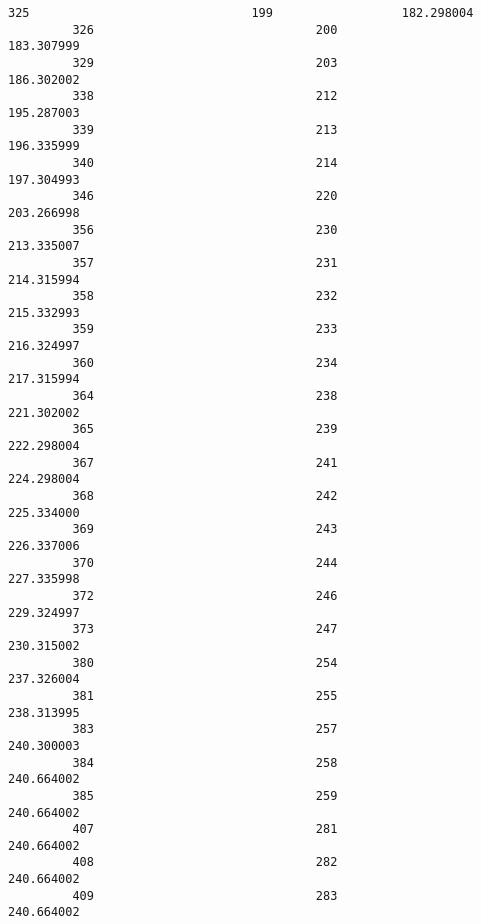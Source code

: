 \documentclass[11pt]{article}
\begin{document}
\begin{Verbatim}[commandchars=\\\{\}]
         325                               199                  182.298004   
         326                               200                  183.307999   
         329                               203                  186.302002   
         338                               212                  195.287003   
         339                               213                  196.335999   
         340                               214                  197.304993   
         346                               220                  203.266998   
         356                               230                  213.335007   
         357                               231                  214.315994   
         358                               232                  215.332993   
         359                               233                  216.324997   
         360                               234                  217.315994   
         364                               238                  221.302002   
         365                               239                  222.298004   
         367                               241                  224.298004   
         368                               242                  225.334000   
         369                               243                  226.337006   
         370                               244                  227.335998   
         372                               246                  229.324997   
         373                               247                  230.315002   
         380                               254                  237.326004   
         381                               255                  238.313995   
         383                               257                  240.300003   
         384                               258                  240.664002   
         385                               259                  240.664002   
         407                               281                  240.664002   
         408                               282                  240.664002   
         409                               283                  240.664002   
         

\end{Verbatim}
\end{document}
